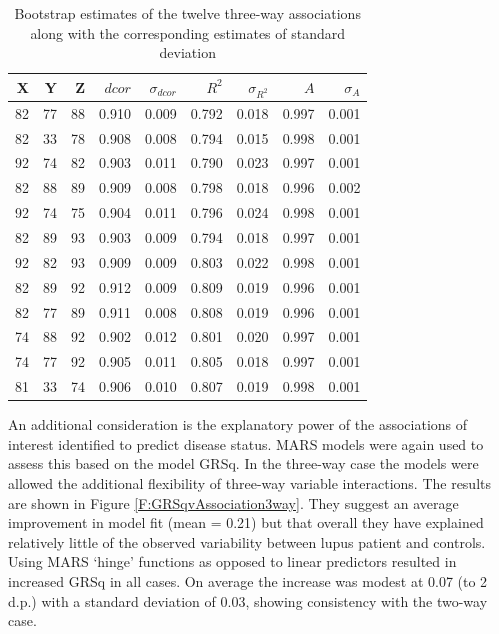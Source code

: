 \documentclass[a4paper, 12pt]{report}
\begin{document}
\begin{table}[H]
\begin{centering}
\begin{tabular}{rrrrrrrrr}
  \hline
 X & Y & Z & $dcor$ & $\sigma_{dcor}$ & $R^2$ & $\sigma_{R^2}$ & $A$ & $\sigma_A$ \\ 
  \hline
82 &   77 &   88 & 0.910 & 0.009 & 0.792 & 0.018 & 0.997 & 0.001 \\ 
 82 &   33 &   78 & 0.908 & 0.008 & 0.794 & 0.015 & 0.998 & 0.001 \\ 
 92 &   74 &   82 & 0.903 & 0.011 & 0.790 & 0.023 & 0.997 & 0.001 \\ 
  82 &   88 &   89 & 0.909 & 0.008 & 0.798 & 0.018 & 0.996 & 0.002 \\ 
  92 &   74 &   75 & 0.904 & 0.011 & 0.796 & 0.024 & 0.998 & 0.001 \\ 
  82 &   89 &   93 & 0.903 & 0.009 & 0.794 & 0.018 & 0.997 & 0.001 \\ 
  92 &   82 &   93 & 0.909 & 0.009 & 0.803 & 0.022 & 0.998 & 0.001 \\ 
  82 &   89 &   92 & 0.912 & 0.009 & 0.809 & 0.019 & 0.996 & 0.001 \\ 
  82 &   77 &   89 & 0.911 & 0.008 & 0.808 & 0.019 & 0.996 & 0.001 \\ 
  74 &   88 &   92 & 0.902 & 0.012 & 0.801 & 0.020 & 0.997 & 0.001 \\ 
 74 &   77 &   92 & 0.905 & 0.011 & 0.805 & 0.018 & 0.997 & 0.001 \\ 
  81 &   33 &   74 & 0.906 & 0.010 & 0.807 & 0.019 & 0.998 & 0.001 \\ 
   \hline
\end{tabular}
\caption{Bootstrap estimates of the twelve three-way associations along with the corresponding estimates of standard deviation} 
\label{tabsmall}
\end{centering}
\end{table}

An additional consideration is the explanatory power of the associations of interest identified to predict disease status. MARS models were again used to assess this based on the model GRSq. In the three-way case the models were allowed the additional flexibility of three-way variable interactions. The results are shown in Figure \ref{F:GRSqvAssociation3way}. They suggest an average improvement in model fit (mean = 0.21) but that overall they have explained relatively little of the observed variability between lupus patient and controls. Using MARS `hinge' functions as opposed to linear predictors resulted in increased GRSq in all cases. On average the increase was modest at 0.07 (to 2 d.p.) with a standard deviation of 0.03, showing consistency with the two-way case.
\end{document}
